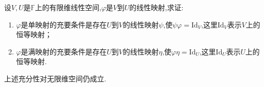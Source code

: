 \documentclass[../../main.tex]{subfiles}
\begin{document}
\begin{proposition}\label{proposition:线性映射是单射或满射的充要条件1}
设\(V,U\)是\(\mathbb{F}\)上的有限维线性空间,\(\varphi\)是\(V\)到\(U\)的线性映射,求证:
\begin{enumerate}[(1)]
\item  \(\varphi\)是单映射的充要条件是存在\(U\)到\(V\)的线性映射\(\psi\),使\(\psi\varphi = \text{Id}_V\),这里\(\text{Id}_V\)表示\(V\)上的恒等映射；

\item \(\varphi\)是满映射的充要条件是存在\(U\)到\(V\)的线性映射\(\eta\),使\(\varphi\eta = \text{Id}_U\),这里\(\text{Id}_U\)表示\(U\)上的恒等映射.
\end{enumerate}
\end{proposition}
\begin{note}
上述充分性对无限维空间仍成立.
\end{note}
\end{document}
